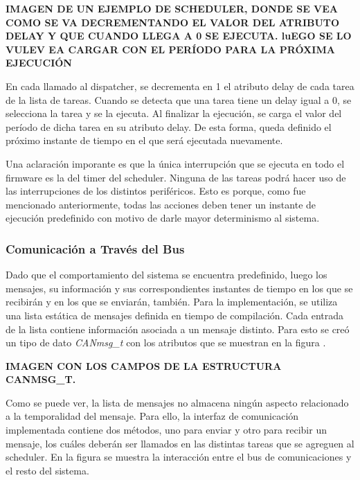 {\Large \textbf{{\color{red} IMAGEN DE UN EJEMPLO DE SCHEDULER, DONDE SE VEA COMO SE VA DECREMENTANDO EL VALOR DEL ATRIBUTO DELAY Y QUE CUANDO LLEGA A 0 SE EJECUTA. luEGO SE LO VULEV EA CARGAR CON EL PERÍODO PARA LA PRÓXIMA EJECUCIÓN}}}

En cada llamado al dispatcher, se decrementa en 1 el atributo delay de cada tarea de la lista de tareas. Cuando se detecta que una tarea tiene un delay igual a 0, se selecciona la tarea y se la ejecuta. Al finalizar la ejecución, se carga el valor del período de dicha tarea en su atributo delay. De esta forma, queda definido el próximo instante de tiempo en el que será ejecutada nuevamente.

Una aclaración imporante es que la única interrupción que se ejecuta en todo el firmware es la del timer del scheduler. Ninguna de las tareas podrá hacer uso de las interrupciones de los distintos periféricos. Esto es porque, como fue mencionado anteriormente, todas las acciones deben tener un instante de ejecución predefinido con motivo de darle mayor determinismo al sistema.

\subsubsection{Comunicación a Través del Bus}


Dado que el comportamiento del sistema se encuentra predefinido, luego los mensajes, su información y sus correspondientes instantes de tiempo en los que se recibirán y en los que se enviarán, también. Para la implementación, se utiliza una lista estática de mensajes definida en tiempo de compilación. Cada entrada de la lista contiene información asociada a un mensaje distinto. Para esto se creó un tipo de dato \textit{CANmsg\_t} con los atributos que se muestran en la figura .

{\Large \textbf{{\color{red} IMAGEN CON LOS CAMPOS DE LA ESTRUCTURA CANMSG\_T.}}}

Como se puede ver, la lista de mensajes no almacena ningún aspecto relacionado a la temporalidad del mensaje. Para ello, la interfaz de comunicación implementada contiene dos métodos, uno para enviar y otro para recibir un mensaje, los cuáles deberán ser llamados en las distintas tareas que se agreguen al scheduler. En la figura  se muestra la interacción entre el bus de comunicaciones y el resto del sistema.

